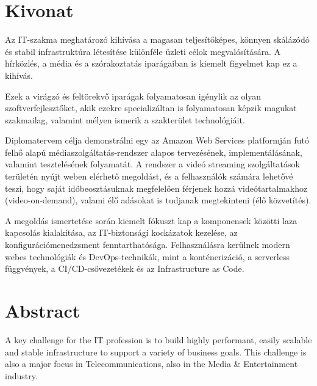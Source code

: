 \setcounter{page}{1}

\selecthungarian

\chapter*{Kivonat}

Az IT-szakma meghatározó kihívása a magasan teljesítőképes, könnyen skálázódó és stabil infrastruktúra létesítése különféle üzleti célok megvalósítására. A hírközlés, a média és a szórakoztatás iparágaiban is kiemelt figyelmet kap ez a kihívás.

Ezek a virágzó és feltörekvő iparágak folyamatosan igénylik az olyan szoftverfejlesztőket, akik ezekre specializáltan is folyamatosan képzik magukat szakmailag, valamint mélyen ismerik a szakterület technológiáit.

Diplomatervem célja demonstrálni egy az Amazon Web Services platformján futó felhő alapú médiaszolgáltatás-rendszer alapos tervezésének, implementálásának, valamint tesztelésének folyamatát. A rendszer a videó streaming szolgáltatások területén nyújt weben elérhető megoldást, és a felhasználók számára lehetővé teszi, hogy saját időbeosztásuknak megfelelően férjenek hozzá videótartalmakhoz (video-on-demand), valami élő adásokat is tudjanak megtekinteni (élő közvetítés).

A megoldás ismertetése során kiemelt fókuszt kap a komponensek közötti laza kapcsolás kialakítása, az IT-biztonsági kockázatok kezelése, az konfigurációmenedzsment fenntarthatósága. Felhasználásra kerülnek modern webes technológiák és DevOps-technikák, mint a konténerizáció, a serverless függvények, a CI/CD-csővezetékek és az Infrastructure as Code.

\vfill
\selectenglish

\chapter*{Abstract}

A key challenge for the IT profession is to build highly performant, easily scalable and stable infrastructure to support a variety of business goals. This challenge is also a major focus in Telecommunications, also in the Media \& Entertainment industry.

